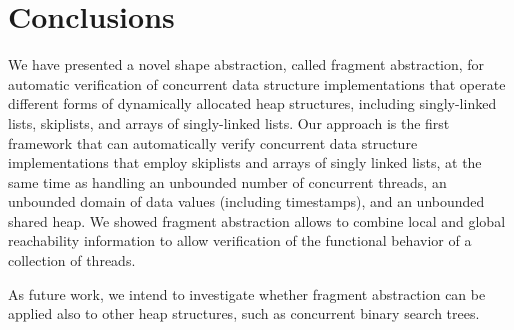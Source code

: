 \section{Conclusions}
\label{sec:conclusions}
We have presented a novel shape abstraction, called fragment abstraction,
for automatic verification of
concurrent data structure implementations that operate different forms of
dynamically allocated heap structures, including singly-linked lists, skiplists,
and arrays of singly-linked lists.
Our approach is the first framework that
can automatically verify concurrent data structure implementations that employ
skiplists and arrays of singly linked lists,
at the same time as handling an unbounded
number of concurrent threads, an unbounded domain of data values
(including timestamps), and an unbounded shared heap.
We showed fragment abstraction allows to combine local and global reachability
information to allow verification of the functional behavior
of a collection of threads.

As future work, we intend to investigate whether fragment abstraction can be
applied also to other heap structures, such as concurrent binary search trees.
%

